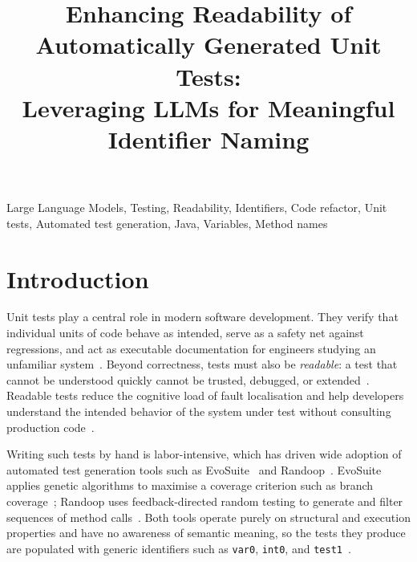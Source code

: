 \documentclass[conference]{IEEEtran}
\begin{document}
\title{Enhancing Readability of Automatically Generated Unit Tests:\\
Leveraging LLMs for Meaningful Identifier Naming}

\author{%
}

\maketitle

\begin{abstract}
\end{abstract}

\begin{IEEEkeywords}
Large Language Models, Testing, Readability, Identifiers, Code refactor,
Unit tests, Automated test generation, Java, Variables, Method names
\end{IEEEkeywords}

\section{Introduction}

Unit tests play a central role in modern software development.
They verify that individual units of code behave as intended, serve as a safety
net against regressions, and act as executable documentation for engineers
studying an unfamiliar system~\cite{daka2017generating,demeyer2009oop}.
Beyond correctness, tests must also be \emph{readable}: a test that cannot be
understood quickly cannot be trusted, debugged, or
extended~\cite{roy2020deeptcenhancer}.
Readable tests reduce the cognitive load of fault localisation and help
developers understand the intended behavior of the system under test without
consulting production code~\cite{biagiola2025improving}.

Writing such tests by hand is labor-intensive, which has driven wide adoption
of automated test generation tools such as
EvoSuite~\cite{fraser2011evosuite} and
Randoop~\cite{randoop2024tool,pacheco2007feedback}.
EvoSuite applies genetic algorithms to maximise a coverage criterion such as
branch coverage~\cite{mcminn2011search}; Randoop uses feedback-directed random
testing to generate and filter sequences of method
calls~\cite{pacheco2007feedback}.
Both tools operate purely on structural and execution properties and have no
awareness of semantic meaning, so the tests they produce are populated with
generic identifiers such as \texttt{var0}, \texttt{int0}, and
\texttt{test1}~\cite{fraser2013evosuite,wang2025automated}.
\end{document}

